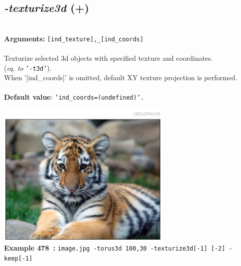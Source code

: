 \documentclass[a4paper,11pt,twoside]{book}
\begin{document}
\subsection{\emph{-texturize3d} (+)}\vspace*{-0.5em}
~\\\textbf{Arguments: } 
{\small \texttt{[ind\_texture],\_[ind\_coords]}}\\~\\
Texturize selected 3d objects with specified texture and coordinates.
~\\(\emph{eq. to} {\small \texttt{'-t3d'}}).
~\\When '[ind\_coords]' is omitted, default XY texture projection is performed.
~\\~\\\textbf{Default value}: {\small \texttt{'ind\_coords=(undefined)'.}}
\begin{center}\includegraphics[keepaspectratio=true,height=7cm,width=\textwidth]{img/gmic_def478.jpg}\\
{\footnotesize \textbf{Example 478~:} \texttt{image.jpg -torus3d 100,30 -texturize3d[-1] [-2] -keep[-1]}}
\end{center}
\end{document}
